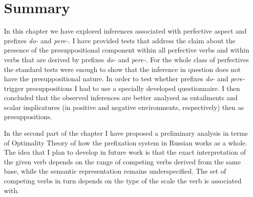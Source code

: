 \section{Summary}
In this chapter we have explored inferences associated with perfective aspect and prefixes \textit{do-} and \textit{pere-}. I have provided tests that address the claim about the presence of the presuppositional component within all perfective verbs and within verbs that are derived by prefixes \textit{do-} and \textit{pere-}. For the whole class of perfectives the standard tests were enough to show that the inference in question does not have the presuppositional nature. In order to test whether prefixes \textit{do-} and \textit{pere-} trigger presuppositions I had to use a specially developed questionnaire. I then concluded that the observed inferences are better analysed as entailments and scalar implicatures (in positive and negative environments, respectively) then as presuppositions.

In the second part of the chapter I have proposed a preliminary analysis in terms of Optimality Theory of how the prefixation system in Russian works as a whole. The idea that I plan to develop in future work is that the exact interpretation of the given verb depends on the range of competing verbs derived from the same base, while the semantic representation remains underspecified. The set of competing verbs in turn depends on the type of the scale the verb is associated with.



